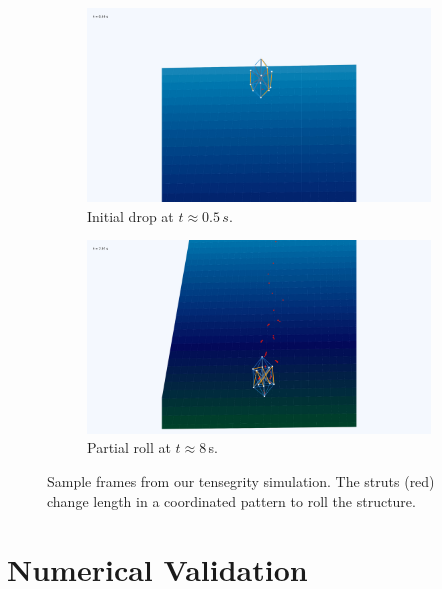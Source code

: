 \documentclass[12pt,letterpaper]{article}
\begin{document}
\begin{figure}[H]
\centering
    \begin{subfigure}[b]{0.78\linewidth}
        \includegraphics[width=\linewidth]{default-0.5s.png}
        \caption{Initial drop at $t\approx 0.5\,s$.}
    \end{subfigure}
    \vspace{0.8em}
    \begin{subfigure}[b]{0.78\linewidth}
        \includegraphics[width=\linewidth]{default-8.0s.png}
        \caption{Partial roll at $t\approx 8$\,s.}
    \end{subfigure}
    \caption{Sample frames from our tensegrity simulation. The struts (red) change length in a coordinated pattern to roll the structure.}
    \label{fig:simulation}
\end{figure}

\section{Numerical Validation}
\end{document}
